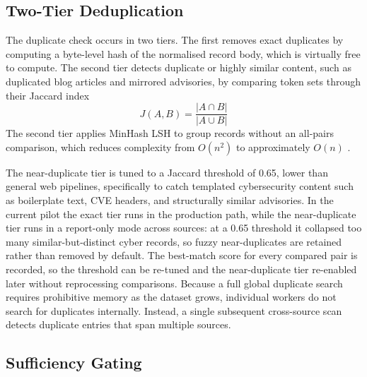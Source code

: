 \documentclass[conference]{IEEEtran}
\begin{document}
\subsection{Two-Tier Deduplication}

The duplicate check occurs in two tiers. The first removes exact duplicates by computing a byte-level hash of the normalised record body, which is virtually free to compute. The second tier detects duplicate or highly similar content, such as duplicated blog articles and mirrored advisories, by comparing token sets through their Jaccard index
\begin{equation}
  J(A, B) = \frac{|A \cap B|}{|A \cup B|}
\end{equation}
The second tier applies MinHash LSH \cite{leskovec2014mmd} to group records without an all-pairs comparison, which reduces complexity from $O(n^2)$ to approximately $O(n)$ \cite{leskovec2014mmd}.

The near-duplicate tier is tuned to a Jaccard threshold of 0.65, lower than general web pipelines, specifically to catch templated cybersecurity content such as boilerplate text, CVE headers, and structurally similar advisories. In the current pilot the exact tier runs in the production path, while the near-duplicate tier runs in a report-only mode across sources: at a 0.65 threshold it collapsed too many similar-but-distinct cyber records, so fuzzy near-duplicates are retained rather than removed by default. The best-match score for every compared pair is recorded, so the threshold can be re-tuned and the near-duplicate tier re-enabled later without reprocessing comparisons. Because a full global duplicate search requires prohibitive memory as the dataset grows, individual workers do not search for duplicates internally. Instead, a single subsequent cross-source scan detects duplicate entries that span multiple sources.

\subsection{Sufficiency Gating}
\end{document}
